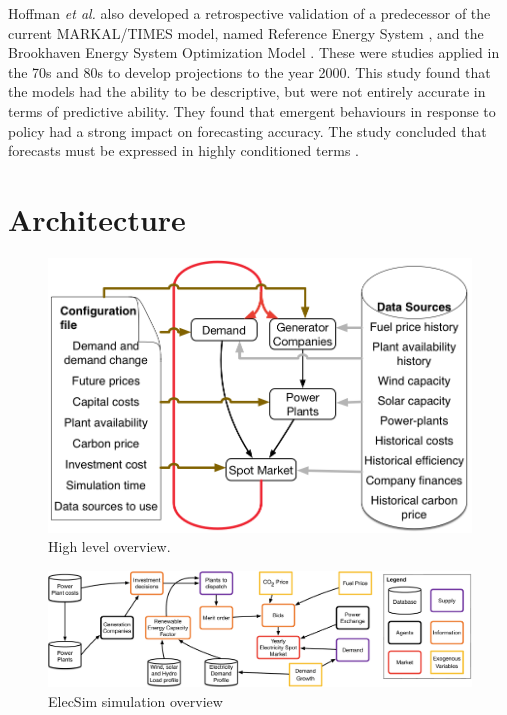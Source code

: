 Hoffman \textit{et al.} also developed a retrospective validation of a predecessor of the current MARKAL\slash TIMES model, named Reference Energy System \cite{Hoffman_1973}, and the Brookhaven Energy System Optimization Model \cite{ERDA_48}. These were studies applied in the 70s and 80s to develop projections to the year 2000. This study found that the models had the ability to be descriptive, but were not entirely accurate in terms of predictive ability. They found that emergent behaviours in response to policy had a strong impact on forecasting accuracy. The study concluded that forecasts must be expressed in highly conditioned terms \cite{Hoffman2011}. 





















\section{Architecture}

\begin{figure}
	\centering
	\includegraphics[width=0.85\linewidth]{Chapter4/figures/System_overview_large.png}
	\caption{High level overview.}
	\label{fig:systemoverview}
	\vskip -6.9mm
\end{figure}

\begin{landscape}
	\begin{figure}
		\centering
		\includegraphics[width=\linewidth]{Chapter4/figures/low_level_system}
		\caption{ElecSim simulation overview}
		\label{fig:lowlevelsystem}
	\end{figure}
\end{landscape}

